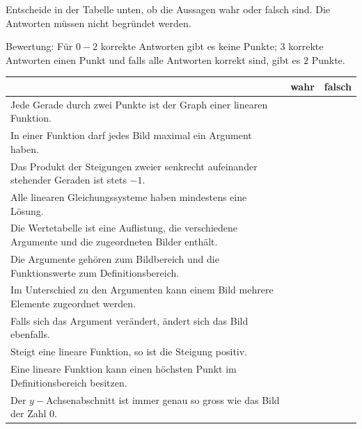 \documentclass[11pt]{exam}
\begin{document}
\begin{questions}
\question[2]
Entscheide in der Tabelle unten, ob die Aussagen wahr oder falsch sind. Die Antworten müssen nicht begründet werden.\newline
\begin{small}
    Bewertung: Für $0-2$ korrekte Antworten gibt es keine Punkte; $3$ korrekte Antworten einen Punkt und falls alle Antworten korrekt sind, gibt es $2$ Punkte.
\end{small}
\begingroup
\renewcommand{\arraystretch}{1.5}
\begin{table}[h]
    \centering
    \begin{tabular}{|p{12cm}|c|c|}\hline
         & wahr & falsch \\\hline
        Jede Gerade durch zwei Punkte ist der Graph einer linearen Funktion. & & \\\hline
        In einer Funktion darf jedes Bild maximal ein Argument haben. & & \\\hline
        Das Produkt der Steigungen zweier senkrecht aufeinander stehender Geraden ist stets $-1$. & & \\\hline
        Alle linearen Gleichungssysteme haben mindestens eine Lösung. & & \\\hline
        Die Wertetabelle ist eine Auflistung, die verschiedene Argumente und die zugeordneten Bilder enthält. & & \\\hline
        Die Argumente gehören zum Bildbereich und die Funktionswerte zum Definitionsbereich. & & \\\hline
        Im Unterschied zu den Argumenten kann einem Bild mehrere Elemente zugeordnet werden.  & & \\\hline
        Falls sich das Argument verändert, ändert sich das Bild ebenfalls. & & \\\hline
        Steigt eine lineare Funktion, so ist die Steigung positiv. & & \\\hline
        Eine lineare Funktion kann einen höchsten Punkt im Definitionsbereich besitzen.  & & \\\hline
        Der $y-$Achsenabschnitt ist immer genau so gross wie das Bild der Zahl $0$. & & \\\hline
    \end{tabular}
\end{table}
\endgroup


\end{questions}
\end{document}
